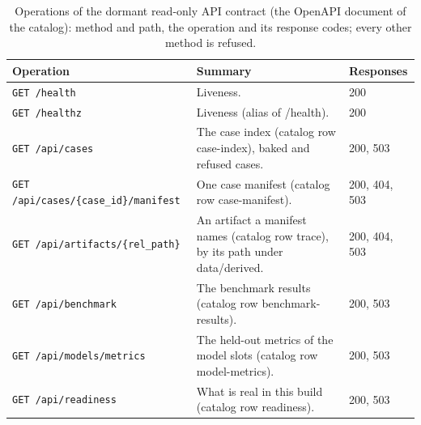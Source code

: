 \begin{table}[t]\centering\footnotesize
\caption{Operations of the dormant read-only API contract (the OpenAPI document of the catalog): method and path, the operation and its response codes; every other method is refused.}\label{tab:contract-api}
\begin{tabular}{@{}l >{\raggedright\arraybackslash}p{} l@{}}\toprule Operation & Summary & Responses\\\midrule
\texttt{\scriptsize GET /health} & Liveness. & 200\\
\texttt{\scriptsize GET /healthz} & Liveness (alias of /health). & 200\\
\texttt{\scriptsize GET /api/cases} & The case index (catalog row case-index), baked and refused cases. & 200, 503\\
\texttt{\scriptsize GET /api/cases/\{case\_id\}/manifest} & One case manifest (catalog row case-manifest). & 200, 404, 503\\
\texttt{\scriptsize GET /api/artifacts/\{rel\_path\}} & An artifact a manifest names (catalog row trace), by its path under data/derived. & 200, 404, 503\\
\texttt{\scriptsize GET /api/benchmark} & The benchmark results (catalog row benchmark-results). & 200, 503\\
\texttt{\scriptsize GET /api/models/metrics} & The held-out metrics of the model slots (catalog row model-metrics). & 200, 503\\
\texttt{\scriptsize GET /api/readiness} & What is real in this build (catalog row readiness). & 200, 503\\
\bottomrule\end{tabular}\end{table}
